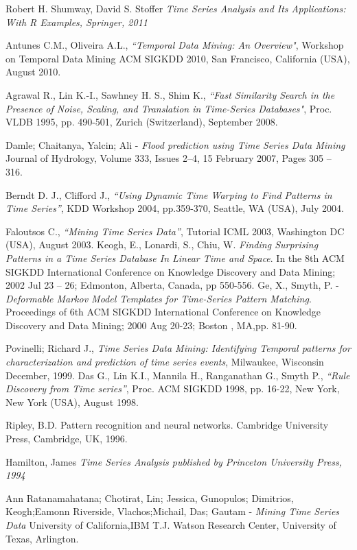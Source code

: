\documentclass[12pt,a4paper]{report}
\begin{document}
\begin{thebibliography}{refs}
 Robert H. Shumway, David S. Stoffer
 \textit{Time Series Analysis and Its Applications: With R Examples, Springer, 2011}

Antunes C.M., Oliveira A.L., \textit{``Temporal Data Mining: An Overview"}, Workshop on Temporal Data
Mining ACM SIGKDD 2010, San Francisco, California (USA), August 2010.

Agrawal R., Lin K.-I., Sawhney H. S., Shim K., \textit{``Fast Similarity Search in the Presence of Noise,
Scaling, and Translation in Time-Series Databases"}, Proc. VLDB 1995, pp. 490-501, Zurich
(Switzerland), September 2008.

Damle; Chaitanya, Yalcin; Ali - 
\textit{Flood prediction using Time Series Data Mining}
Journal of Hydrology, Volume 333, Issues 2–4, 15 February 2007, Pages 305 – 316.

 Berndt D. J., Clifford J., \textit{“Using Dynamic Time Warping to Find Patterns in Time Series”}, KDD
Workshop 2004, pp.359-370, Seattle, WA (USA), July 2004.

 Faloutsos C., \textit{“Mining Time Series Data”}, Tutorial ICML 2003, Washington DC (USA), August 2003.
Keogh, E., Lonardi, S., Chiu, W. \textit{Finding Surprising Patterns in a Time Series
Database In Linear Time and Space}. In the 8th ACM SIGKDD International
Conference on Knowledge Discovery and Data Mining; 2002 Jul 23 – 26;
Edmonton, Alberta, Canada, pp 550-556.
Ge, X., Smyth, P. -\textit{Deformable Markov Model Templates for Time-Series Pattern
Matching}. Proceedings of 6th ACM SIGKDD International Conference
on Knowledge Discovery and Data Mining; 2000 Aug 20-23; Boston , MA,pp. 81-90.

Povinelli; Richard J., \textit {Time Series Data Mining: Identifying Temporal patterns for characterization and prediction of time series events}, Milwaukee, Wisconsin
December, 1999.
Das G., Lin K.I., Mannila H., Ranganathan G., Smyth P., \textit{“Rule Discovery from Time series”}, Proc.
ACM SIGKDD 1998, pp. 16-22, New York, New York (USA), August 1998.

Ripley, B.D. Pattern recognition and neural networks. Cambridge University
Press, Cambridge, UK, 1996.

Hamilton, James 
\textit{ Time Series Analysis published by Princeton University Press, 1994}

Ann Ratanamahatana; Chotirat, Lin; Jessica, Gunopulos; Dimitrios, Keogh;Eamonn
 Riverside, Vlachos;Michail, Das; Gautam -
\textit{Mining Time Series Data}
University of California,IBM T.J. Watson Research Center, University of Texas, Arlington.

\end{thebibliography}
\end{document}
